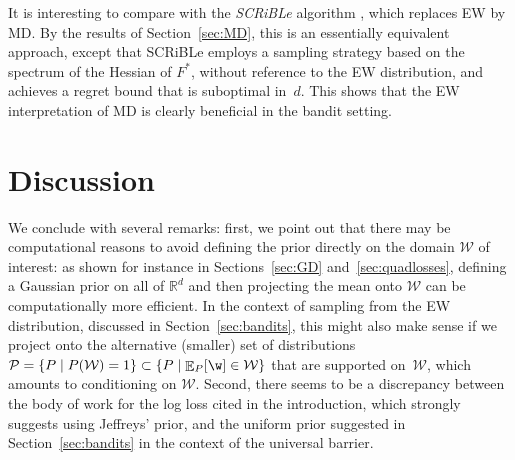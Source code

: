 \documentclass{colt2018} %
\DeclareMathOperator*{\E}{\mathbb{E}}
\newcommand{\reals}{\mathbb{R}}
\newcommand{\domainP}{\mathcal{P}}
\newcommand{\domainw}{\mathcal{W}}
\begin{document}
It is interesting to compare with the \emph{SCRiBLe}
algorithm \citep{Scrible}, which replaces EW by MD. By the
results of Section~\ref{sec:MD}, this is an essentially equivalent
approach, except that SCRiBLe employs a sampling strategy based on the
spectrum of the Hessian of $F^*$, without reference to the EW
distribution, and achieves a regret bound that is suboptimal in~$d$.
This shows that the EW interpretation of MD is clearly beneficial in the
bandit setting.

% 
% 
% 
% 
% 
% 
% 
% 
% 
% 
% 
% 
% 
% 
% 
% 
% 
% 
% 
% 
% 
% 
% 
% 
% 
% 
% 
% 

\section{Discussion}

We conclude with several remarks: first, we point out that there may be
computational reasons to avoid defining the prior directly on the domain
$\domainw$ of interest: as shown for instance in Sections~\ref{sec:GD}
and~\ref{sec:quadlosses}, defining a Gaussian prior on all of $\reals^d$
and then projecting the mean onto $\domainw$ can be computationally more
efficient. In the context of sampling from the EW distribution,
discussed in Section~\ref{sec:bandits}, this might also make sense if we
project onto the alternative (smaller) set of distributions $\domainP =
\{P \mid P(\domainw) = 1\} \subset \{P \mid \E_P[\w] \in \domainw\}$
that are supported on~$\domainw$, which amounts to conditioning on
$\domainw$. Second,
there seems
to be a discrepancy between the body of work for the log loss cited in
the introduction, which strongly suggests using Jeffreys' prior, and the
uniform prior suggested in Section~\ref{sec:bandits} in the context of
the universal barrier. 

% 
% 
% 
% 
% 
% 
% 
% 
% 
% 
% 
% 
% 
% 

% 
% 
% 
% 
% 
% 
% 
% 
% 
% 
% 
% 
% 
% 
% 
% 
% 

\clearpage
% 
\end{document}
